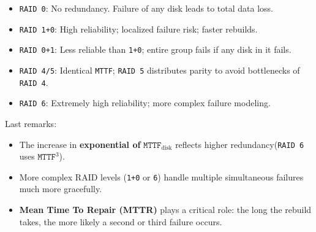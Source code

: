 \begin{itemize}
    \item \texttt{RAID 0}: No redundancy. Failure of any disk leads to total data loss.
    \item \texttt{RAID 1+0}: High reliability; localized failure risk; faster rebuilds.
    \item \texttt{RAID 0+1}: Less reliable than \texttt{1+0}; entire group fails if any disk in it fails.
    \item \texttt{RAID 4/5}: Identical \texttt{MTTF}; \texttt{RAID 5} distributes parity to avoid bottlenecks of \texttt{RAID 4}.
    \item \texttt{RAID 6}: Extremely high reliability; more complex failure modeling.
\end{itemize}
Last remarks:
\begin{itemize}
    \item The increase in \textbf{exponential of} $\texttt{MTTF}_{\text{disk}}$ reflects higher redundancy\break (\texttt{RAID 6} uses $\texttt{MTTF}^{3}$).
    \item More complex RAID levels (\texttt{1+0} or \texttt{6}) handle multiple simultaneous failures much more gracefully.
    \item \textbf{Mean Time To Repair (MTTR)} plays a critical role: the long the rebuild takes, the more likely a second or third failure occurs.
\end{itemize}